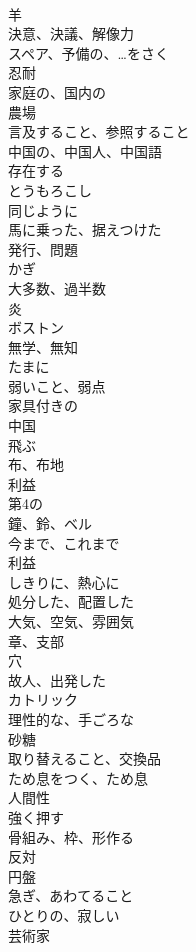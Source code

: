 \documentclass[8pt]{extreport}
\begin{document}
\begin{CJK}{UTF8}{min}
\\	羊
\\	決意、決議、解像力
\\	スペア、予備の、…をさく
\\	忍耐
\\	家庭の、国内の
\\	農場
\\	言及すること、参照すること
\\	中国の、中国人、中国語
\\	存在する
\\	とうもろこし
\\	同じように
\\	馬に乗った、据えつけた
\\	発行、問題
\\	かぎ
\\	大多数、過半数
\\	炎
\\	ボストン
\\	無学、無知
\\	たまに
\\	弱いこと、弱点
\\	家具付きの
\\	中国
\\	飛ぶ
\\	布、布地
\\	利益
\\	第4の
\\	鐘、鈴、ベル
\\	今まで、これまで
\\	利益
\\	しきりに、熱心に
\\	処分した、配置した
\\	大気、空気、雰囲気
\\	章、支部
\\	穴
\\	故人、出発した
\\	カトリック
\\	理性的な、手ごろな
\\	砂糖
\\	取り替えること、交換品
\\	ため息をつく、ため息
\\	人間性
\\	強く押す
\\	骨組み、枠、形作る
\\	反対
\\	円盤
\\	急ぎ、あわてること
\\	ひとりの、寂しい
\\	芸術家

\end{CJK}
\end{document}
